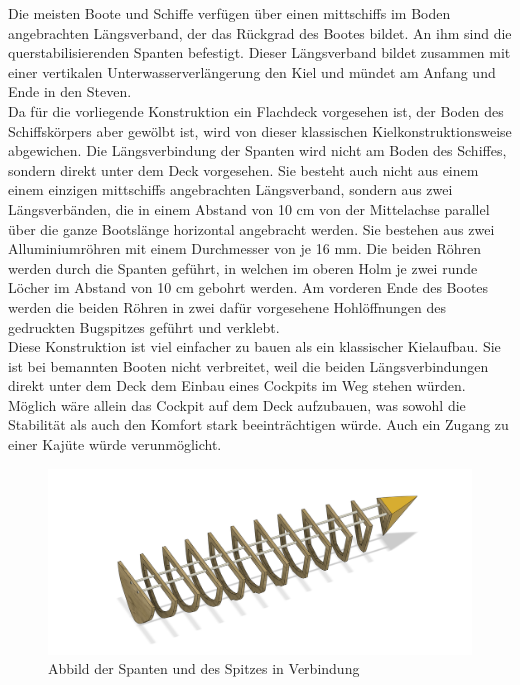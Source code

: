 {\begin{figure}[H]
\end{figure}
Die meisten Boote und Schiffe verfügen über einen mittschiffs im Boden angebrachten Längsverband, der das Rückgrad des Bootes bildet. An ihm sind die querstabilisierenden Spanten befestigt. Dieser Längsverband bildet zusammen mit einer vertikalen Unterwasserverlängerung den Kiel und mündet am Anfang und Ende in den Steven.  \\
Da für die vorliegende Konstruktion ein Flachdeck vorgesehen ist, der Boden des Schiffskörpers aber gewölbt ist, wird von dieser klassischen Kielkonstruktionsweise abgewichen. Die Längsverbindung der Spanten wird nicht am Boden des Schiffes, sondern direkt unter dem Deck vorgesehen. Sie besteht auch nicht aus einem  einem einzigen mittschiffs angebrachten Längsverband, sondern aus zwei Längsverbänden, die in einem  Abstand von 10 cm von der Mittelachse parallel über die ganze Bootslänge horizontal angebracht werden. Sie bestehen aus zwei Alluminiumröhren mit einem Durchmesser von je 16 mm. Die beiden Röhren werden durch die Spanten geführt, in welchen im oberen Holm je zwei runde Löcher im Abstand von 10 cm gebohrt werden. Am vorderen Ende des Bootes werden die beiden Röhren in zwei dafür vorgesehene Hohlöffnungen des gedruckten Bugspitzes geführt und verklebt.  \\
Diese Konstruktion ist viel einfacher zu bauen als ein klassischer Kielaufbau.  Sie ist bei  bemannten Booten nicht verbreitet, weil die beiden Längsverbindungen direkt unter dem Deck dem Einbau eines Cockpits im Weg stehen würden. Möglich wäre allein das Cockpit auf dem Deck aufzubauen, was sowohl die Stabilität als auch den Komfort stark beeinträchtigen würde. Auch ein  Zugang zu einer Kajüte würde verunmöglicht. 
\begin{figure}[H]
    \centering
    \includegraphics[width=1\linewidth]{assets/full_skellet.png}
    \caption{Abbild der Spanten und des Spitzes in Verbindung}
    
\end{figure}

}
